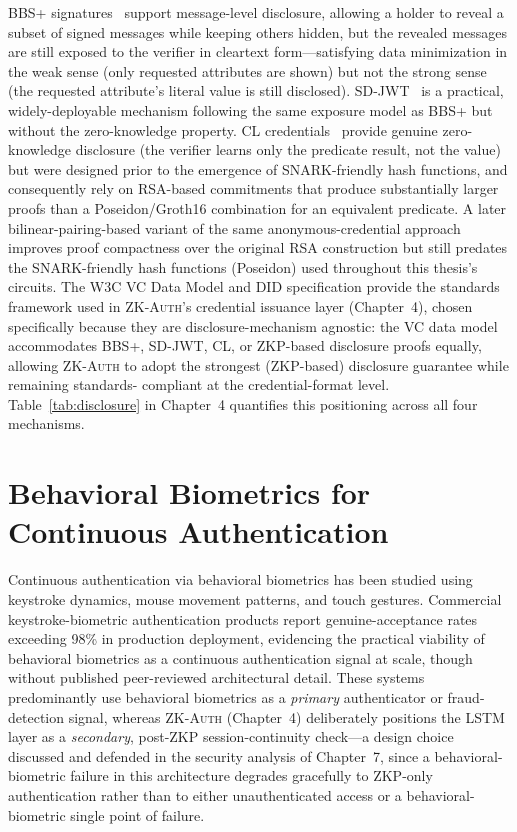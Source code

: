\documentclass[12pt,a4paper,oneside]{report}
\begin{document}
BBS+ signatures~\cite{bbs} support message-level disclosure, allowing a
holder to reveal a subset of signed messages while keeping others hidden,
but the revealed messages are still exposed to the verifier in cleartext
form---satisfying data minimization in the weak sense (only requested
attributes are shown) but not the strong sense (the requested attribute's
literal value is still disclosed). SD-JWT~\cite{sdjwt} is a practical,
widely-deployable mechanism following the same exposure model as BBS+ but
without the zero-knowledge property. CL credentials~\cite{cl} provide
genuine zero-knowledge disclosure (the verifier learns only the predicate
result, not the value) but were designed prior to the emergence of
SNARK-friendly hash functions, and consequently rely on RSA-based
commitments that produce substantially larger proofs than a
Poseidon/Groth16 combination for an equivalent predicate. A later
bilinear-pairing-based variant of the same anonymous-credential
approach~\cite{camenisch04} improves proof compactness over the original
RSA construction but still predates the SNARK-friendly hash functions
(Poseidon) used throughout this thesis's circuits. The W3C VC Data
Model and DID specification provide the
standards framework used in \textsc{ZK-Auth}'s credential issuance layer
(Chapter~4), chosen specifically because they are disclosure-mechanism
agnostic: the VC data model accommodates BBS+, SD-JWT, CL, or ZKP-based
disclosure proofs equally, allowing \textsc{ZK-Auth} to adopt the
strongest (ZKP-based) disclosure guarantee while remaining standards-
compliant at the credential-format level. Table~\ref{tab:disclosure} in
Chapter~4 quantifies this positioning across all four mechanisms.

\section{Behavioral Biometrics for Continuous Authentication}
\label{sec:behavioral_lit}

Continuous authentication via behavioral biometrics has been studied using
keystroke dynamics, mouse movement patterns, and touch gestures. 
Commercial keystroke-biometric authentication products report
genuine-acceptance rates exceeding 98\% in production deployment,
evidencing the practical viability of behavioral biometrics as a
continuous authentication signal at scale, though without published
peer-reviewed architectural detail.
These systems predominantly use behavioral biometrics as a
\textit{primary} authenticator or fraud-detection signal, whereas
\textsc{ZK-Auth} (Chapter~4) deliberately positions the LSTM layer as a
\textit{secondary}, post-ZKP session-continuity check---a design choice
discussed and defended in the security analysis of Chapter~7, since a
behavioral-biometric failure in this architecture degrades gracefully to
ZKP-only authentication rather than to either unauthenticated access or a
behavioral-biometric single point of failure.
\end{document}
